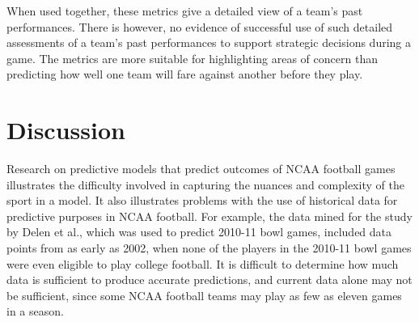 \documentclass[sigconf]{acmart}
\begin{document}
When used together, these metrics give a detailed view of a team's past performances. There is however, no evidence of successful use of such detailed assessments of a team's past performances to support strategic decisions during a game. The metrics are more suitable for highlighting areas of concern than predicting how well one team will fare against another before they play.


\section{Discussion}
	Research on predictive models that predict outcomes of NCAA football games illustrates the difficulty involved in capturing the nuances and complexity of the sport in a model. It also illustrates problems with the use of historical data for predictive purposes in NCAA football. For example, the data mined for the study by Delen et al., which was used to predict 2010-11 bowl games, included data points from as early as 2002, when none of the players in the 2010-11 bowl games were even eligible to play college football. It is difficult to determine how much data is sufficient to produce accurate predictions, and current data alone may not be sufficient, since some NCAA football teams may play as few as eleven games in a season.
\end{document}
